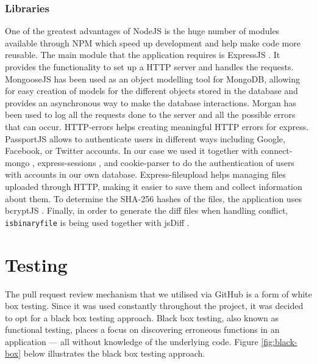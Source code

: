 \documentclass[11pt]{article}
\begin{document}
\subsubsection*{Libraries}

One of the greatest advantages of NodeJS is the huge number of modules available through NPM which speed up development and help make code more reusable. 
The main module that the application requires is ExpressJS \cite{expressjs:19}. It provides the functionality to set up a HTTP server and handles the requests.
MongooseJS \cite{mongoosejs:19} has been used as an object modelling tool for MongoDB, allowing for easy creation of models for the different objects stored in the database and provides an asynchronous way to make the database interactions.
Morgan \cite{morgan:19} has been used to log all the requests done to the server and all the possible errors that can occur.
HTTP-errors \cite{http-errors:19} helps creating meaningful HTTP errors for express.
PassportJS \cite{passportjs:19} allows to authenticate users in different ways including Google, Facebook, or Twitter accounts. In our case we used it together with connect-mongo \cite{connect-mongo:19}, express-sessions \cite{express-sessions:19}, and cookie-parser \cite{cookie-parser:19} to do the authentication of users with accounts in our own database.
Express-fileupload \cite{express-fileupload:19} helps managing files uploaded through HTTP, making it easier to save them and collect information about them.
To determine the SHA-256 hashes of the files, the application uses bcryptJS \cite{bcryptjs:19}.
Finally, in order to generate the diff files when handling conflict, {\tt isbinaryfile} \cite{isbinaryfile:19} is being used together with jsDiff \cite{jsdiff:19}.


\section{Testing}

The pull request review mechanism that we utilised via GitHub is a form of white box testing. Since it was used constantly throughout the project, it was decided to opt for a black box testing \cite{blackboxtesting:19} approach. Black box testing, also known as functional testing, places a focus on discovering erroneous functions in an application --- all without knowledge of the underlying code. Figure \ref{fig:black-box} below illustrates the black box testing approach.
\end{document}
